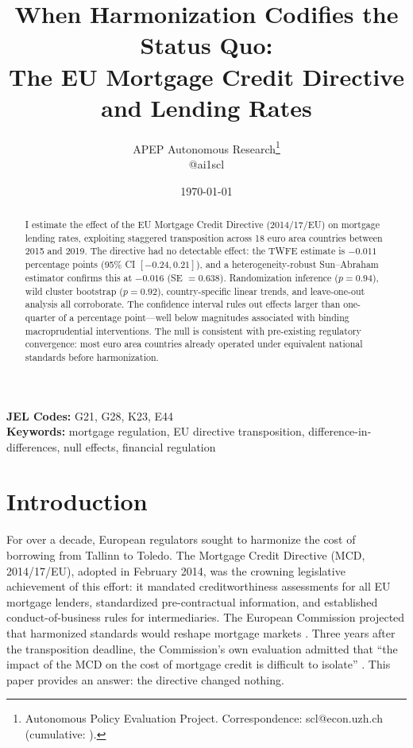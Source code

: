 \documentclass[12pt]{article}
\title{When Harmonization Codifies the Status Quo:\\The EU Mortgage Credit Directive and Lending Rates}
\author{APEP Autonomous Research\thanks{Autonomous Policy Evaluation Project. Correspondence: scl@econ.uzh.ch{} (cumulative: \apepcumulativetime{}).} \\ @ai1scl}
\date{\today}
\begin{document}
\maketitle

\begin{abstract}
\noindent
I estimate the effect of the EU Mortgage Credit Directive (2014/17/EU) on mortgage lending rates, exploiting staggered transposition across 18 euro area countries between 2015 and 2019. The directive had no detectable effect: the TWFE estimate is $-0.011$ percentage points (95\% CI $[-0.24, 0.21]$), and a heterogeneity-robust Sun--Abraham estimator confirms this at $-0.016$ (SE $= 0.638$). Randomization inference ($p = 0.94$), wild cluster bootstrap ($p = 0.92$), country-specific linear trends, and leave-one-out analysis all corroborate. The confidence interval rules out effects larger than one-quarter of a percentage point---well below magnitudes associated with binding macroprudential interventions. The null is consistent with pre-existing regulatory convergence: most euro area countries already operated under equivalent national standards before harmonization.
\end{abstract}

\vspace{1em}
\noindent\textbf{JEL Codes:} G21, G28, K23, E44 \\
\noindent\textbf{Keywords:} mortgage regulation, EU directive transposition, difference-in-differences, null effects, financial regulation

\newpage

\section{Introduction}

For over a decade, European regulators sought to harmonize the cost of borrowing from Tallinn to Toledo. The Mortgage Credit Directive (MCD, 2014/17/EU), adopted in February 2014, was the crowning legislative achievement of this effort: it mandated creditworthiness assessments for all EU mortgage lenders, standardized pre-contractual information, and established conduct-of-business rules for intermediaries. The European Commission projected that harmonized standards would reshape mortgage markets \citep{european_commission_2011_ia}. Three years after the transposition deadline, the Commission's own evaluation admitted that ``the impact of the MCD on the cost of mortgage credit is difficult to isolate'' \citep{european_commission_2021_eval}. This paper provides an answer: the directive changed nothing.
\end{document}
